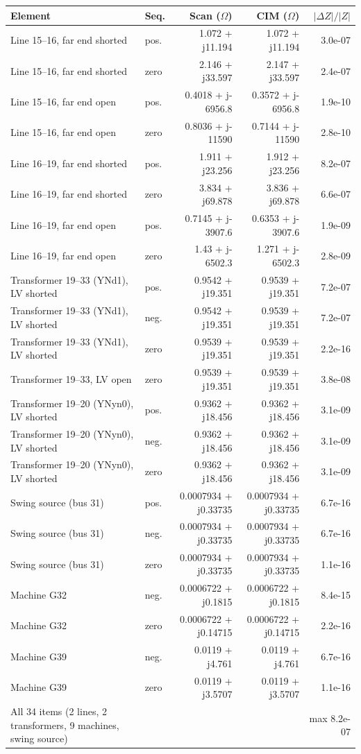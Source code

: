 \begin{tabular}{llrrr}
\toprule
Element & Seq. & Scan ($\Omega$) & CIM ($\Omega$) & $|\Delta Z|/|Z|$ \\
\midrule
Line 15--16, far end shorted & pos. & 1.072 + j11.194 & 1.072 + j11.194 & 3.0e-07 \\
Line 15--16, far end shorted & zero & 2.146 + j33.597 & 2.147 + j33.597 & 2.4e-07 \\
Line 15--16, far end open & pos. & 0.4018 + j-6956.8 & 0.3572 + j-6956.8 & 1.9e-10 \\
Line 15--16, far end open & zero & 0.8036 + j-11590 & 0.7144 + j-11590 & 2.8e-10 \\
Line 16--19, far end shorted & pos. & 1.911 + j23.256 & 1.912 + j23.256 & 8.2e-07 \\
Line 16--19, far end shorted & zero & 3.834 + j69.878 & 3.836 + j69.878 & 6.6e-07 \\
Line 16--19, far end open & pos. & 0.7145 + j-3907.6 & 0.6353 + j-3907.6 & 1.9e-09 \\
Line 16--19, far end open & zero & 1.43 + j-6502.3 & 1.271 + j-6502.3 & 2.8e-09 \\
Transformer 19--33 (YNd1), LV shorted & pos. & 0.9542 + j19.351 & 0.9539 + j19.351 & 7.2e-07 \\
Transformer 19--33 (YNd1), LV shorted & neg. & 0.9542 + j19.351 & 0.9539 + j19.351 & 7.2e-07 \\
Transformer 19--33 (YNd1), LV shorted & zero & 0.9539 + j19.351 & 0.9539 + j19.351 & 2.2e-16 \\
Transformer 19--33, LV open & zero & 0.9539 + j19.351 & 0.9539 + j19.351 & 3.8e-08 \\
Transformer 19--20 (YNyn0), LV shorted & pos. & 0.9362 + j18.456 & 0.9362 + j18.456 & 3.1e-09 \\
Transformer 19--20 (YNyn0), LV shorted & neg. & 0.9362 + j18.456 & 0.9362 + j18.456 & 3.1e-09 \\
Transformer 19--20 (YNyn0), LV shorted & zero & 0.9362 + j18.456 & 0.9362 + j18.456 & 3.1e-09 \\
Swing source (bus 31) & pos. & 0.0007934 + j0.33735 & 0.0007934 + j0.33735 & 6.7e-16 \\
Swing source (bus 31) & neg. & 0.0007934 + j0.33735 & 0.0007934 + j0.33735 & 6.7e-16 \\
Swing source (bus 31) & zero & 0.0007934 + j0.33735 & 0.0007934 + j0.33735 & 1.1e-16 \\
Machine G32 & neg. & 0.0006722 + j0.1815 & 0.0006722 + j0.1815 & 8.4e-15 \\
Machine G32 & zero & 0.0006722 + j0.14715 & 0.0006722 + j0.14715 & 2.2e-16 \\
Machine G39 & neg. & 0.0119 + j4.761 & 0.0119 + j4.761 & 6.7e-16 \\
Machine G39 & zero & 0.0119 + j3.5707 & 0.0119 + j3.5707 & 1.1e-16 \\
All 34 items (2 lines, 2 transformers, 9 machines, swing source) &  &  &  & max 8.2e-07 \\
\bottomrule
\end{tabular}
